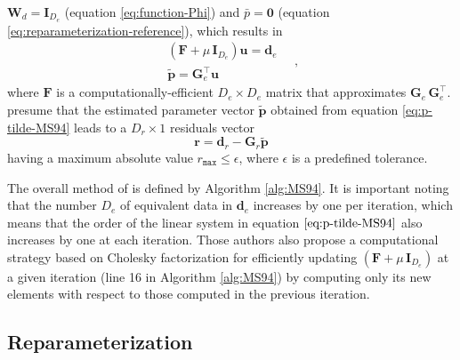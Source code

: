 \documentclass[utf8]{FrontiersinHarvard} %
\begin{document}
	$\mathbf{W}_{d} = \mathbf{I}_{D_{e}}$ (equation \ref{eq:function-Phi}) and $\bar{p} = \mathbf{0}$ (equation \ref{eq:reparameterization-reference}), 
	which results in
	\begin{equation}
		\begin{split}
			\left(\mathbf{F} + \mu \, \mathbf{I}_{D_{e}} \right) \mathbf{u} = \mathbf{d}_{e} \\
			\tilde{\mathbf{p}} = \mathbf{G}_{e}^{\top} \mathbf{u}
		\end{split} \quad ,
		\label{eq:p-tilde-MS94}
	\end{equation}
	where $\mathbf{F}$ is a computationally-efficient $D_{e} \times D_{e}$ matrix that approximates $\mathbf{G}_{e} \, \mathbf{G}_{e}^{\top}$.
	\cite{mendonca-silva1994} presume that the estimated parameter vector $\tilde{\mathbf{p}}$ obtained from equation \ref{eq:p-tilde-MS94}
	leads to a $D_{r} \times 1$ residuals vector
	\begin{equation}
		\mathbf{r} = \mathbf{d}_{r} - \mathbf{G}_{r} \tilde{\mathbf{p}} 
		\label{eq:residuals-MS94}
	\end{equation}
	having a maximum absolute value $r_{\mathtt{max}} \le \epsilon$, where $\epsilon$ is a predefined tolerance.
	
	The overall method of \cite{mendonca-silva1994} is defined by Algorithm \ref{alg:MS94}.
	It is important noting that the number $D_{e}$ of equivalent data in $\mathbf{d}_{e}$ increases by one per iteration,
	which means that the order of the linear system in equation $\ref{eq:p-tilde-MS94}$ also increases by one at each iteration.
	Those authors also propose a computational strategy based on Cholesky factorization \cite[e.g.,][p. 163]{golub-vanloan2013}
	for efficiently updating 
	$\left(\mathbf{F} + \mu \, \mathbf{I}_{D_{e}} \right)$ at a given iteration (line 16 in Algorithm \ref{alg:MS94}) 
	by computing only its new elements with respect to those computed in the previous iteration.
	
	\subsection{Reparameterization}
	
\end{document}
